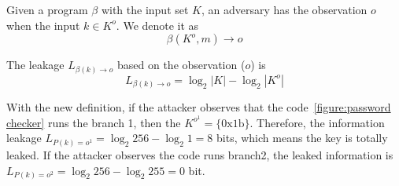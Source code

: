 \begin{mydef}
\label{def}
Given a program $\beta$ with the input set $K$, 
an adversary has the observation $o$ when the input $k{\in}K^o$. 
We denote it as
$$\beta(K^o, m) \rightarrow	o$$

The leakage $L_{\beta(k)\rightarrow o}$ based on the observation ($o$) is
    $$L_{\beta(k)\rightarrow o} = \log_2{|K|} - \log_2{|K^o|}$$
\end{mydef}

With the new definition, if the attacker observes that the code~\ref{figure:password checker} runs the branch 1, 
then the $K^{o^{1}} = \{\mathrm{0x1b}\}$. Therefore, the information leakage $L_{P(k)=o^{1}} = \log_2{256} - \log_2{1} = 8$
bits, which means the key is totally leaked. If the attacker observes the code runs branch2, the leaked information is 
$L_{P(k)=o^{2}} = \log_2{256} - \log_2{255} = 0$ bit.


